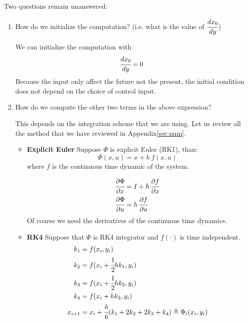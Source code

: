 Two questions remain unanswered:
\begin{enumerate}
\item How do we initialize the computation? (i.e. what is the value of $\cfrac{dx_0}{dy}$)

We can initialize the computation with 
\[\cfrac{dx_0}{dy} = 0\]
Because the input only affect the future not the present, the initial condition does not depend on the choice of control input.
\item How do we compute the other two terms in the above expression?

This depends on the integration scheme that we are using. Let us review all the method that we have reviewed in Appendix\ref{sec:num}.
\begin{itemize}
\item \textbf{Explicit Euler}
Suppose $\Phi$ is explicit Euler (RK1), than:
\[\Phi(x,u) = x + h\,f(x,u)\]
where $f$ is the continuous time dynamic of the system.

\begin{align*}
\cfrac{\partial\Phi}{\partial x} &= I + h\,\cfrac{\partial f}{\partial x}\\
\cfrac{\partial\Phi}{\partial u} &= h\,\cfrac{\partial f}{\partial u}
\end{align*}
Of course we need the derivatives of the continuous time dynamics.
\item \textbf{RK4}
Suppose that $\Phi$ is RK4 integrator and $f(\cdot)$ is time independent.
\begin{align*}
k_1 &= f(x_i, y_i)\\
k_2 &= f(x_i+\cfrac{1}{2}hk_1, y_i)\\
k_3 &= f(x_i+\cfrac{1}{2}hk_2, y_i)\\
k_4 &= f(x_i+hk_3, y_i)\\
x_{i+1} &= x_i + \cfrac{h}{6}(k_1 + 2k_2 + 2k_3 + k_4) \triangleq \Phi_i(x_i, y_i)
\end{align*}


\end{itemize}
\end{enumerate}

